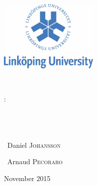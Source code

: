 \begin{titlepage}
\thispagestyle{empty}
\begin{center}

\begin{minipage}[t]{0.48\textwidth}
  \begin{flushleft}
    \includegraphics [width=48mm]{images/logo-univ.jpg} \\[0.5cm]

  \end{flushleft}
\end{minipage}
\begin{minipage}[t]{0.48\textwidth}
  \begin{flushright}

  \end{flushright}
\end{minipage} \\[1.0cm] %

\vspace{5.3cm}

\textsc{\Large \reportsubject :}\\[2cm]

\HRule \\[0.4cm]
{\Large \bfseries \reporttitle}\\[0.4cm]
\HRule \\[1.5cm]

\vspace{1.5cm}

\vspace{4.5cm}
\begin{minipage}[t]{0.30\textwidth}
  \begin{flushleft} \normalsize
     ~Daniel \textsc{Johansson} \\
 \end{flushleft}
\end{minipage}
\begin{minipage}[t]{0.6\textwidth}
  \begin{flushright} \normalsize

    ~Arnaud \textsc{Pecoraro} \\
  \end{flushright}
\end{minipage}

\vfill
\vspace*{0.440cm}
{\large November 2015 }

\end{center}
\end{titlepage}

